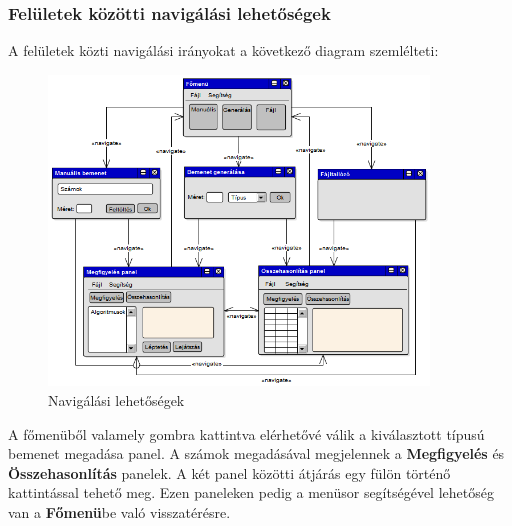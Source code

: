 \documentclass{elteikthesis}
\begin{document}
\subsubsection{Felületek közötti navigálási lehetőségek}
A felületek közti navigálási irányokat a következő diagram szemlélteti:
\begin{figure}[H]
	\centering
	\includegraphics[width=0.9\textwidth]{pics/plan_directions.png}
	\caption{Navigálási lehetőségek}
\end{figure}
A főmenüből valamely gombra kattintva elérhetővé válik a kiválasztott típusú bemenet megadása panel. A számok megadásával megjelennek a \textbf{Megfigyelés} és \textbf{Összehasonlítás} panelek. A két panel közötti átjárás egy fülön történő kattintással tehető meg. Ezen paneleken pedig a menüsor segítségével lehetőség van a \textbf{Főmenü}be való visszatérésre.
\end{document}
